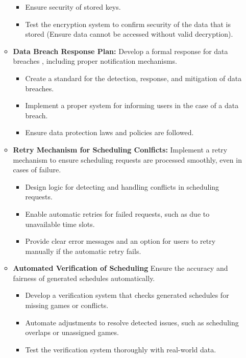 \documentclass{article}
\begin{document}
\begin{enumerate}
\begin{itemize}
\begin{itemize}
                        \item Ensure security of stored keys.
                        \item Test the encryption system to confirm security of the data that is stored (Ensure data cannot be accessed without valid decryption).
                    \end{itemize}
              \item \textbf{Data Breach Response Plan:} Develop a formal response for data breaches , including proper notification mechanisms.
                    \begin{itemize}
                        \item Create a standard for the detection, response, and mitigation of data breaches.
                        \item Implement a proper system for informing users in the case of a data breach.
                        \item Ensure data protection laws and policies are followed.
                    \end{itemize}
              \item \textbf{Retry Mechanism for Scheduling Conlficts:} Implement a retry mechanism to ensure scheduling requests are processed smoothly, even in cases of failure.
                    \begin{itemize}
                        \item Design logic for detecting and handling conflicts in scheduling requests.
                        \item Enable automatic retries for failed requests, such as due to unavailable time slots.
                        \item Provide clear error messages and an option for users to retry manually if the automatic retry fails.
                    \end{itemize}
              \item \textbf{Automated Verification of Scheduling} Ensure the accuracy and fairness of generated schedules automatically.
                    \begin{itemize}
                        \item Develop a verification system that checks generated schedules for missing games or conflicts.
                        \item Automate adjustments to resolve detected issues, such as scheduling overlaps or unassigned games.
                        \item Test the verification system thoroughly with real-world data.
                    \end{itemize}

          \end{itemize}
\end{enumerate}
\end{document}
